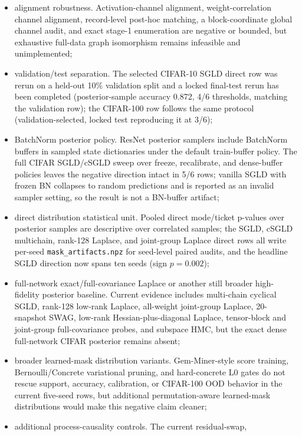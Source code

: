 \documentclass{article}
\begin{document}
\begin{itemize}
  \item alignment robustness. Activation-channel alignment, weight-correlation
  channel alignment, record-level post-hoc matching, a block-coordinate global
  channel audit, and exact stage-1 enumeration are negative or bounded, but
  exhaustive full-data graph isomorphism remains infeasible and unimplemented;
  \item validation/test separation. The selected CIFAR-10 SGLD direct row
  was rerun on a held-out 10\% validation split and a locked final-test
  rerun has been completed (posterior-sample accuracy 0.872, 4/6
  thresholds, matching the validation row); the CIFAR-100 row follows the
  same protocol (validation-selected, locked test reproducing it at 3/6);
  \item BatchNorm posterior policy. ResNet posterior samplers include
  BatchNorm buffers in sampled state dictionaries under the default
  train-buffer policy. The full CIFAR SGLD/cSGLD sweep over freeze,
  recalibrate, and dense-buffer policies leaves the negative direction
  intact in 5/6 rows; vanilla SGLD with frozen BN collapses to random
  predictions and is reported as an invalid sampler setting, so the result
  is not a BN-buffer artifact;
  \item direct distribution statistical unit. Pooled direct mode/ticket
  p-values over posterior samples are descriptive over correlated samples;
  the SGLD, cSGLD multichain, rank-128 Laplace, and joint-group Laplace
  direct rows all write per-seed \texttt{mask\_artifacts.npz} for
  seed-level paired audits, and the headline SGLD direction now spans ten
  seeds (sign $p = 0.002$);
  \item full-network exact/full-covariance Laplace or another still broader
  high-fidelity posterior baseline. Current evidence includes multi-chain
  cyclical SGLD, rank-128 low-rank Laplace, all-weight joint-group Laplace,
  20-snapshot SWAG, low-rank Hessian-plus-diagonal Laplace, tensor-block and
  joint-group full-covariance probes, and subspace HMC, but the exact dense
  full-network CIFAR posterior remains absent;
  \item broader learned-mask distribution variants. Gem-Miner-style score
  training, Bernoulli/Concrete variational pruning, and hard-concrete L0 gates
  do not rescue support, accuracy, calibration, or CIFAR-100 OOD behavior in
  the current five-seed rows, but additional permutation-aware learned-mask
  distributions would make this negative claim cleaner;
  \item additional process-causality controls. The current residual-swap,

\end{itemize}
\end{document}
